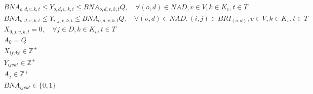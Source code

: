 \begin{align}
	& BNA_{o,d,v,k,t} \leq Y_{o,d,v,k,t} \leq BNA_{o,d,v,k,t} Q, \quad  \forall (o,d)\in NAD, v \in V, k \in K_v, t \in T                                                                                                                \label{eq: m1_activ_bin_autho}            \\
	& BNA_{o,d,v,k,t} \leq Y_{i,j,v,k,t} \leq BNA_{o,d,v,k,t} Q, \quad  \forall (o,d)\in NAD, (i,j) \in BRI_{(o,d)}, v \in V, k \in K_v, t \in T                                                                                            \label{eq: m1_autho_igualar_trecho_maior}  \\
	& X_{0,j,v,k,t} = 0,     \quad \forall j \in D, k \in K_v, t \in T                                                                                                                                                                     \label{eq: m1_ini_assig}                   \\
	& A_{0} = Q                                                                                                                                                                                                      \label{eq: m1_ini_disponi}                 \\
	& X_{ijvkt} \in \mathbb{Z}^+                                                                                                                                                                                     \label{eq: m1_dom_assig}                   \\
	& Y_{ijvkt} \in \mathbb{Z}^+                                                                                                                                                                                     \label{eq: m1_dom_autho}                   \\
	& A_{j} \in \mathbb{Z}^+                                                                                                                                                                                         \label{eq: m1_dom_disponi}                 \\
	& BNA_{ijvkt} \in \{0,1\}                                                                                                                                                                                        \label{eq: m1_dom_bin_nadja}
\end{align}
